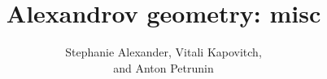\title{Alexandrov geometry: misc}
\date{}
\author{Stephanie Alexander, Vitali Kapovitch,\\ and Anton Petrunin}
\maketitle
\thispagestyle{empty}
